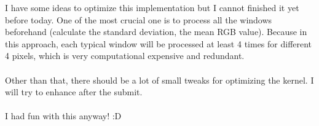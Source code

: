 \documentclass[12pt]{article}
\begin{document}
I have some ideas to optimize this implementation but I cannot finished it yet before today. One of the most crucial one is to process all the windows beforehand (calculate the standard deviation, the mean RGB value). Because in this approach, each typical window will be processed at least 4 times for different 4 pixels, which is very computational expensive and redundant.
\\\\
Other than that, there should be a lot of small tweaks for optimizing the kernel. I will try to enhance after the submit.
\\\\
I had fun with this anyway! :D
\end{document}
